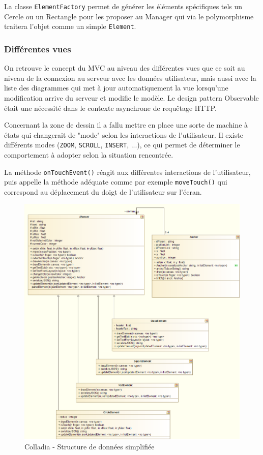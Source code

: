La classe \lstinline$ElementFactory$ permet de générer les éléments spécifiques tels un Cercle ou un Rectangle pour les proposer au Manager qui via le polymorphisme traitera l'objet comme un simple \lstinline$Element$.

\subsubsection{Différentes vues}
On retrouve le concept du MVC au niveau des différentes vues que ce soit au niveau de la connexion au serveur avec les données utilisateur, mais aussi avec la liste des diagrammes qui met à jour automatiquement la vue lorsqu'une modification arrive du serveur et modifie le modèle. Le design pattern Observable était une nécessité dans le contexte asynchrone de requêtage HTTP.

Concernant la zone de dessin il a fallu mettre en place une sorte de machine à états qui changerait de "mode" selon les interactions de l'utilisateur. Il existe différents modes (\lstinline$ZOOM$, \lstinline$SCROLL$, \lstinline$INSERT$, ...), ce qui permet de déterminer le comportement à adopter selon la situation rencontrée.

La méthode \lstinline$onTouchEvent()$ réagit aux différentes interactions de l'utilisateur, puis appelle la méthode adéquate comme par exemple \lstinline$moveTouch()$ qui correspond au déplacement du doigt de l'utilisateur sur l'écran.

\newpage
	\begin{figure}[!h]
		\centering
		\includegraphics[width=\textwidth]{img/UmlArchiStructureData}
		\caption{Colladia - Structure de données simplifiée}
	\end{figure}

